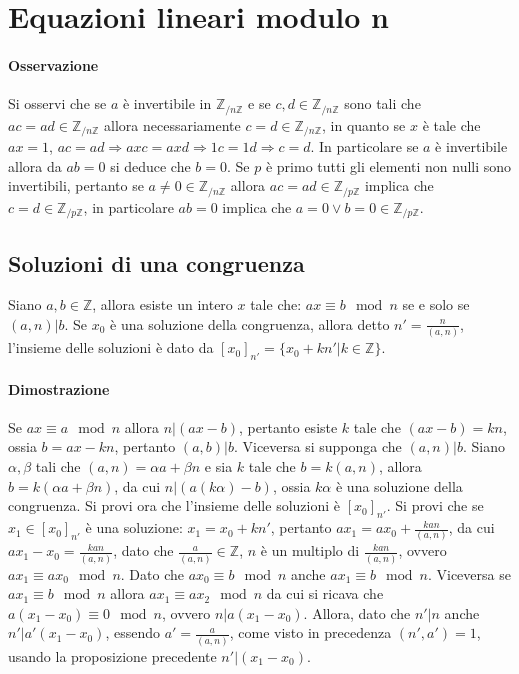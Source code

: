 \chapter{Equazioni lineari modulo n}
\subsubsection{Osservazione}
Si osservi che se $a$ \`e invertibile in $\mathbb{Z}_{/n\mathbb{Z}}$ e se $c,d\in\mathbb{Z}_{/n\mathbb{Z}}$ sono tali che $ac=ad\in\mathbb{Z}_{/n\mathbb{Z}}$ allora 
necessariamente $c=d\in\mathbb{Z}_{/n\mathbb{Z}}$, in quanto se $x$ \`e tale che $ax=1$, $ac=ad\Rightarrow axc=axd\Rightarrow 1c=1d\Rightarrow c=d$. In particolare se $a$ \`e
invertibile allora da $ab=0$ si deduce che $b=0$. Se $p$ \`e primo tutti gli elementi non nulli sono invertibili, pertanto se $a\neq0\in\mathbb{Z}_{/n\mathbb{Z}}$ allora $ac=ad
\in\mathbb{Z}_{/p\mathbb{Z}}$ implica che $c=d\in\mathbb{Z}_{/p\mathbb{Z}}$, in particolare $ab=0$ implica che $a=0\lor b=0\in\mathbb{Z}_{/p\mathbb{Z}}$.
\section{Soluzioni di una congruenza}
Siano $a,b\in\mathbb{Z}$, allora esiste un intero $x$ tale che: $ax\equiv b\mod n$ se e solo se $(a,n)|b$. Se $x_0$ \`e una soluzione della congruenza, allora detto $n'=
\frac{n}{(a,n)}$, l'insieme delle soluzioni \`e dato da $[x_0]_{n'}=\{x_0+kn'|k\in\mathbb{Z}\}$.
\subsubsection{Dimostrazione}
Se $ax\equiv a \mod n$ allora $n|(ax-b)$, pertanto esiste $k$ tale che $(ax-b)=kn$, ossia $b=ax-kn$, pertanto $(a,b)|b$. Viceversa si supponga che $(a,n)|b$. Siano $\alpha,
\beta$ tali che $(a,n)=\alpha a+\beta n$ e sia $k$ tale che $b=k(a,n)$, allora $b=k(\alpha a+\beta n)$, da cui $n|(a(k\alpha)-b)$, ossia $k\alpha$ \`e una soluzione della 
congruenza. Si provi ora che l'insieme delle soluzioni \`e $[x_0]_{n'}$. Si provi che se $x_1\in[x_0]_{n'}$ \`e una soluzione: $x_1=x_0+kn'$, pertanto $ax_1=ax_0+\frac{kan}
{(a,n)}$, da cui $ax_1-x_0=\frac{kan}{(a,n)}$, dato che $\frac{a}{(a,n)}\in\mathbb{Z}$, $n$ \`e un multiplo di $\frac{kan}{(a,n)}$, ovvero $ax_1\equiv ax_0\mod n$. Dato che 
$ax_0\equiv b\mod n$ anche $ax_1\equiv b\mod n$. Viceversa se $ax_1\equiv b\mod n$ allora $ax_1\equiv ax_2\mod n$ da cui si ricava che $a(x_1-x_0)\equiv 0\mod n$, ovvero $n|
a(x_1-x_0)$. Allora, dato che $n'|n$ anche $n'|a'(x_1-x_0)$, essendo $a'=\frac{a}{(a,n)}$, come visto in precedenza $(n',a')=1$, usando la proposizione precedente $n'|(x_1-x_0)
$.
